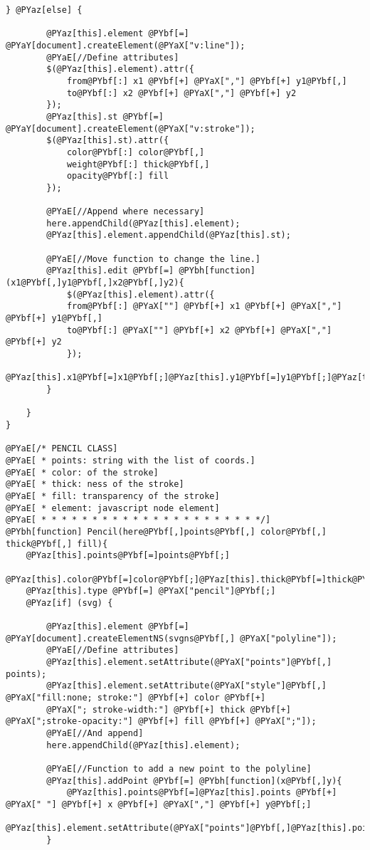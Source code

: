 \begin{Verbatim}[commandchars=@\[\]]
    } @PYaz[else] {
		
        @PYaz[this].element @PYbf[=] @PYaY[document].createElement(@PYaX["v:line"]);
        @PYaE[//Define attributes]
		$(@PYaz[this].element).attr({
            from@PYbf[:] x1 @PYbf[+] @PYaX[","] @PYbf[+] y1@PYbf[,]
            to@PYbf[:] x2 @PYbf[+] @PYaX[","] @PYbf[+] y2
        });
		@PYaz[this].st @PYbf[=] @PYaY[document].createElement(@PYaX["v:stroke"]);
        $(@PYaz[this].st).attr({
            color@PYbf[:] color@PYbf[,]
            weight@PYbf[:] thick@PYbf[,]
            opacity@PYbf[:] fill
        });
		
		@PYaE[//Append where necessary]
		here.appendChild(@PYaz[this].element);
		@PYaz[this].element.appendChild(@PYaz[this].st);
        
		@PYaE[//Move function to change the line.]
		@PYaz[this].edit @PYbf[=] @PYbh[function](x1@PYbf[,]y1@PYbf[,]x2@PYbf[,]y2){
			$(@PYaz[this].element).attr({
            from@PYbf[:] @PYaX[""] @PYbf[+] x1 @PYbf[+] @PYaX[","] @PYbf[+] y1@PYbf[,]
            to@PYbf[:] @PYaX[""] @PYbf[+] x2 @PYbf[+] @PYaX[","] @PYbf[+] y2
        	});
			@PYaz[this].x1@PYbf[=]x1@PYbf[;]@PYaz[this].y1@PYbf[=]y1@PYbf[;]@PYaz[this].x2@PYbf[=]x2@PYbf[;]@PYaz[this].y2@PYbf[=]y2@PYbf[;]
		}
		
    }
}

@PYaE[/* PENCIL CLASS]
@PYaE[ * points: string with the list of coords.]
@PYaE[ * color: of the stroke]
@PYaE[ * thick: ness of the stroke]
@PYaE[ * fill: transparency of the stroke]
@PYaE[ * element: javascript node element]
@PYaE[ * * * * * * * * * * * * * * * * * * * * * */]
@PYbh[function] Pencil(here@PYbf[,]points@PYbf[,] color@PYbf[,] thick@PYbf[,] fill){
	@PYaz[this].points@PYbf[=]points@PYbf[;]
	@PYaz[this].color@PYbf[=]color@PYbf[;]@PYaz[this].thick@PYbf[=]thick@PYbf[;]@PYaz[this].fill@PYbf[=]fill@PYbf[;]
	@PYaz[this].type @PYbf[=] @PYaX["pencil"]@PYbf[;]
    @PYaz[if] (svg) {
		
        @PYaz[this].element @PYbf[=] @PYaY[document].createElementNS(svgns@PYbf[,] @PYaX["polyline"]);
		@PYaE[//Define attributes]
        @PYaz[this].element.setAttribute(@PYaX["points"]@PYbf[,] points);
        @PYaz[this].element.setAttribute(@PYaX["style"]@PYbf[,] @PYaX["fill:none; stroke:"] @PYbf[+] color @PYbf[+]
        @PYaX["; stroke-width:"] @PYbf[+] thick @PYbf[+] @PYaX[";stroke-opacity:"] @PYbf[+] fill @PYbf[+] @PYaX[";"]);
		@PYaE[//And append]
		here.appendChild(@PYaz[this].element);
		
		@PYaE[//Function to add a new point to the polyline]
		@PYaz[this].addPoint @PYbf[=] @PYbh[function](x@PYbf[,]y){
			@PYaz[this].points@PYbf[=]@PYaz[this].points @PYbf[+] @PYaX[" "] @PYbf[+] x @PYbf[+] @PYaX[","] @PYbf[+] y@PYbf[;]
			@PYaz[this].element.setAttribute(@PYaX["points"]@PYbf[,]@PYaz[this].points);
		}
		

\end{Verbatim}
